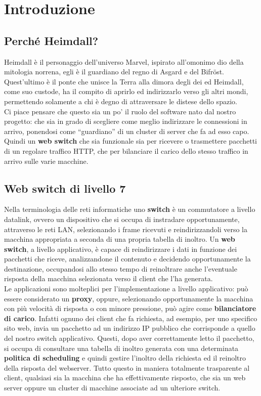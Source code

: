 \documentclass[italian]{tktltiki2}
\begin{document}
\newpage
\section{Introduzione}
\subsection{Perché Heimdall?}
Heimdall è il personaggio dell'universo Marvel, ispirato all'omonimo dio della mitologia norrena, egli è il guardiano del regno di Asgard e del Bifröst. Quest'ultimo è il ponte che unisce la Terra alla dimora degli dei ed Heimdall, come suo custode, ha il compito di aprirlo ed indirizzarlo verso gli altri mondi, permettendo solamente a chi è degno di attraversare le distese dello spazio. \\
Ci piace pensare che questo sia un po' il ruolo del software nato dal nostro progetto: che sia in grado di scegliere come meglio indirizzare le connessioni in arrivo, ponendosi come ``guardiano'' di un cluster di server che fa ad esso capo. Quindi un \textbf{web switch} che sia funzionale sia per ricevere o trasmettere pacchetti di un regolare traffico HTTP, che per bilanciare il carico dello stesso traffico in arrivo sulle varie macchine.

\subsection{Web switch di livello 7}
Nella terminologia delle reti informatiche uno \textbf{switch} è un commutatore a livello datalink, ovvero un dispositivo che si occupa di instradare opportunamente, attraverso le reti LAN, selezionando i frame ricevuti e reindirizzandoli verso la macchina appropriata a seconda di una propria tabella di inoltro. Un \textbf{web switch}, a livello applicativo, è capace di reindirizzare i dati in funzione dei pacchetti che riceve, analizzandone il contenuto e decidendo opportunamente la destinazione, occupandosi allo stesso tempo di reinoltrare anche l'eventuale risposta della macchina selezionata verso il client che l'ha generata. \\
Le applicazioni sono molteplici per l'implementazione a livello applicativo: può essere considerato un \textbf{proxy}, oppure, selezionando opportunamente la macchina con più velocità di risposta o con minore pressione, può agire come \textbf{bilanciatore di carico}. Infatti ognuno dei client che fa richiesta, ad esempio, per uno specifico sito web, invia un pacchetto ad un indirizzo IP pubblico che corrisponde a quello del nostro switch applicativo. Questi, dopo aver correttamente letto il pacchetto, si occupa di consultare una tabella di inoltro generata con una determinata \textbf{politica di scheduling} e quindi gestire l'inoltro della richiesta ed il reinoltro della risposta del webserver. Tutto questo in maniera totalmente trasparente al client, qualsiasi sia la macchina che ha effettivamente risposto, che sia un web server oppure un cluster di macchine associate ad un ulteriore switch.
\end{document}
